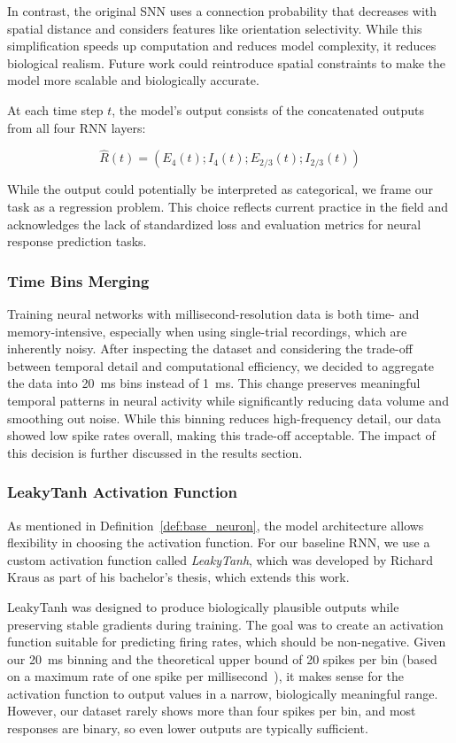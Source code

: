 In contrast, the original SNN uses a connection probability that decreases with spatial distance and considers features like orientation selectivity. While this simplification speeds up computation and reduces model complexity, it reduces biological realism. Future work could reintroduce spatial constraints to make the model more scalable and biologically accurate.

At each time step $t$, the model's output consists of the concatenated outputs from all four RNN layers:

$$\hat{R}(t) = (E_4(t); I_4(t); E_{2/3}(t); I_{2/3}(t))$$

While the output could potentially be interpreted as categorical, we frame our task as a regression problem. This choice reflects current practice in the field and acknowledges the lack of standardized loss and evaluation metrics for neural response prediction tasks.

\subsubsection{Time Bins Merging}
\label{subsubsec:time_bins_merging}

Training neural networks with millisecond-resolution data is both time- and memory-intensive, especially when using single-trial recordings, which are inherently noisy. After inspecting the dataset and considering the trade-off between temporal detail and computational efficiency, we decided to aggregate the data into 20~ms bins instead of 1~ms. This change preserves meaningful temporal patterns in neural activity while significantly reducing data volume and smoothing out noise. While this binning reduces high-frequency detail, our data showed low spike rates overall, making this trade-off acceptable. The impact of this decision is further discussed in the results section.

\subsubsection{LeakyTanh Activation Function}
\label{subsubsec:leakytanh}

As mentioned in Definition~\ref{def:base_neuron}, the model architecture allows flexibility in choosing the activation function. For our baseline RNN, we use a custom activation function called \emph{LeakyTanh}, which was developed by Richard Kraus as part of his bachelor's thesis, which extends this work.

LeakyTanh was designed to produce biologically plausible outputs while preserving stable gradients during training. The goal was to create an activation function suitable for predicting firing rates, which should be non-negative. Given our 20~ms binning and the theoretical upper bound of 20 spikes per bin (based on a maximum rate of one spike per millisecond~\citep{dayan2005theoretical}), it makes sense for the activation function to output values in a narrow, biologically meaningful range. However, our dataset rarely shows more than four spikes per bin, and most responses are binary, so even lower outputs are typically sufficient.

